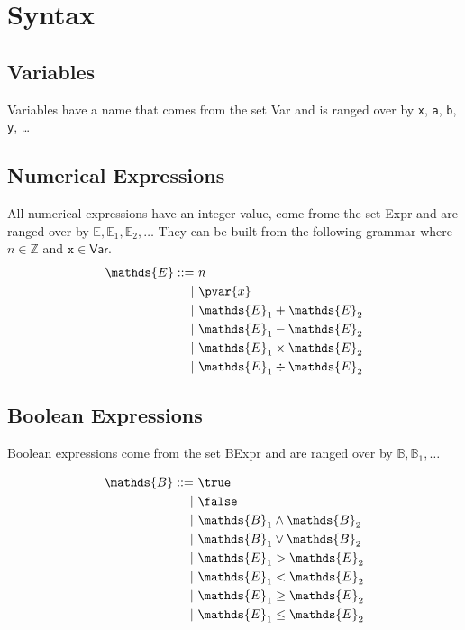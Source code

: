 \section{Syntax}

\subsection{Variables}

Variables have a name that comes from the set \textsf{Var} and is ranged over by \texttt{x}, \texttt{a}, \texttt{b}, \texttt{y}, \ldots

\subsection{Numerical Expressions}

All numerical expressions have an integer value, come frome the set \textsf{Expr} and are ranged over by $\mathds{E}, \mathds{E}_1, \mathds{E}_2, \ldots$ They can be built from the following grammar where $n \in \mathds{Z}$ and $\mathtt{x} \in \mathsf{Var}$.
\begin{align*}
\mathds{E} ::=&
\ n \\
|&\ \pvar{x} \\
|&\ \mathds{E}_1 + \mathds{E}_2 \\
|&\ \mathds{E}_1 - \mathds{E}_2 \\
|&\ \mathds{E}_1 \times \mathds{E}_2 \\
|&\ \mathds{E}_1 \div \mathds{E}_2 \\
\end{align*}

\subsection{Boolean Expressions}

Boolean expressions come from the set \textsf{BExpr} and are ranged over by $\mathds{B}, \mathds{B}_1, \ldots$

\begin{align*}
\mathds{B} ::=&
\ \true \\
|&\ \false \\
|&\ \mathds{B}_1 \land \mathds{B}_2 \\
|&\ \mathds{B}_1 \lor \mathds{B}_2 \\
|&\ \mathds{E}_1 > \mathds{E}_2 \\
|&\ \mathds{E}_1 < \mathds{E}_2 \\
|&\ \mathds{E}_1 \geq \mathds{E}_2 \\
|&\ \mathds{E}_1 \leq \mathds{E}_2 \\
\end{align*}

